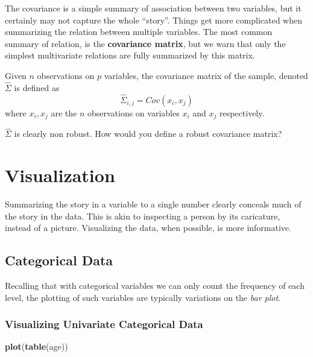 \documentclass[]{book}
\newenvironment{Shaded}{\begin{snugshade}}{\end{snugshade}}
\newcommand{\KeywordTok}[1]{\textcolor[rgb]{0.13,0.29,0.53}{\textbf{{#1}}}}
\newcommand{\NormalTok}[1]{{#1}}
\theoremstyle{definition}
\theoremstyle{definition}
\theoremstyle{remark}
\let\BeginKnitrBlock\begin \let\EndKnitrBlock\end
\begin{document}
The covariance is a simple summary of association between two variables,
but it certainly may not capture the whole ``story''. Things get more
complicated when summarizing the relation between multiple variables.
The most common summary of relation, is the \textbf{covariance matrix},
but we warn that only the simplest multivariate relations are fully
summarized by this matrix.

\BeginKnitrBlock{definition}
\protect\hypertarget{def:unnamed-chunk-77}{}{\label{def:unnamed-chunk-77}}Given
\(n\) observations on \(p\) variables, the covariance matrix of the
sample, denoted \(\hat \Sigma\) is defined as
\[\hat \Sigma_{i,j}=Cov(x_i,x_j)\] where \(x_i,x_j\) are the \(n\)
observations on variables \(x_i\) and \(x_j\) respectively.
\EndKnitrBlock{definition}

\BeginKnitrBlock{remark}
\(\hat \Sigma\) is clearly non robust. How would
you define a robust covariance matrix?
\EndKnitrBlock{remark}

\section{Visualization}\label{visualization}

Summarizing the story in a variable to a single number clearly conceals
much of the story in the data. This is akin to inspecting a person by
its caricature, instead of a picture. Visualizing the data, when
possible, is more informative.

\subsection{Categorical Data}\label{categorical-data-1}

Recalling that with categorical variables we can only count the
frequency of each level, the plotting of such variables are typically
variations on the \emph{bar plot}.

\subsubsection{Visualizing Univariate Categorical
Data}\label{visualizing-univariate-categorical-data}

\begin{Shaded}
\begin{Highlighting}[]
\KeywordTok{plot}\NormalTok{(}\KeywordTok{table}\NormalTok{(age))}
\end{Highlighting}
\end{Shaded}
\end{document}
